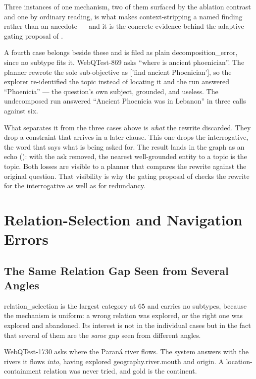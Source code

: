 Three instances of one mechanism, two of them surfaced by the ablation contrast
and one by ordinary reading, is what makes context-stripping a named finding
rather than an anecdote --- and it is the concrete evidence behind the
adaptive-gating proposal of .

A fourth case belongs beside these and is filed as plain
\textsf{decomposition\_error}, since no subtype fits it. \textsf{WebQTest-869}
asks ``where is ancient phoenician''. The planner rewrote the sole sub-objective
as \textsf{['find ancient Phoenician']}, so the explorer re-identified the topic
instead of locating it and the run answered ``Phoenicia'' --- the question's own
subject, grounded, and useless. The undecomposed run answered ``Ancient
Phoenicia was in Lebanon'' in three calls against six.

What separates it from the three cases above is \emph{what} the rewrite
discarded. They drop a constraint that arrives in a later clause. This one drops
the interrogative, the word that says what is being asked for. The result lands
in the graph as an \textsf{echo} (): with the ask removed, the
nearest well-grounded entity to a topic is the topic. Both losses are visible to
a planner that compares the rewrite against the original question. That
visibility is why the gating proposal of  checks the rewrite
for the interrogative as well as for redundancy.

\section{Relation-Selection and Navigation Errors}\label{sec:relation-errors}

\subsection{The Same Relation Gap Seen from Several Angles}

\textsf{relation\_selection} is the largest category at $65$ and carries no
subtypes, because the mechanism is uniform: a wrong relation was explored, or
the right one was explored and abandoned. Its interest is not in the individual
cases but in the fact that several of them are the \emph{same} gap seen from
different angles.

\textsf{WebQTest-1730} asks where the Paraná river flows. The system answers
with the rivers it flows \emph{into}, having explored
\textsf{geography.river.mouth} and \textsf{origin}. A location-containment
relation was never tried, and gold is the continent.

